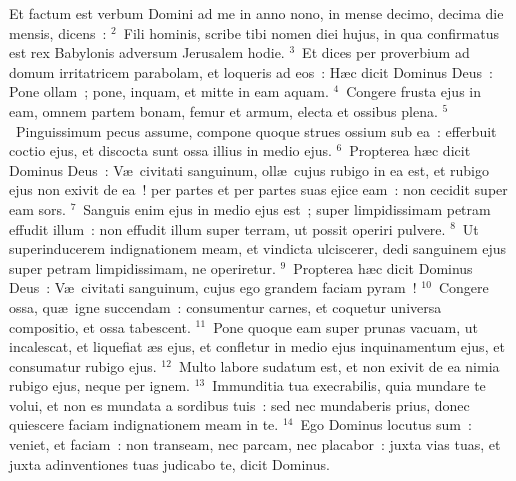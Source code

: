 \bchapter
\lettrine[lines=3,image=true,loversize=0.05,lraise=-0.03]{E}{}t factum est verbum Domini ad me in anno nono, in mense decimo, decima die mensis, dicens~:
${}^{2}$~Fili hominis, scribe tibi nomen diei hujus, in qua confirmatus est rex Babylonis adversum Jerusalem hodie.
${}^{3}$~Et dices per proverbium ad domum irritatricem parabolam, et loqueris ad eos~: H\ae c dicit Dominus Deus~: Pone ollam~; pone, inquam, et mitte in eam aquam.
${}^{4}$~Congere frusta ejus in eam, omnem partem bonam, femur et armum, electa et ossibus plena.
${}^{5}$~Pinguissimum pecus assume, compone quoque strues ossium sub ea~: efferbuit coctio ejus, et discocta sunt ossa illius in medio ejus.
${}^{6}$~Propterea h\ae c dicit Dominus Deus~: V\ae\ civitati sanguinum, oll\ae\ cujus rubigo in ea est, et rubigo ejus non exivit de ea~! per partes et per partes suas ejice eam~: non cecidit super eam sors.
${}^{7}$~Sanguis enim ejus in medio ejus est~; super limpidissimam petram effudit illum~: non effudit illum super terram, ut possit operiri pulvere.
${}^{8}$~Ut superinducerem indignationem meam, et vindicta ulciscerer, dedi sanguinem ejus super petram limpidissimam, ne operiretur.
${}^{9}$~Propterea h\ae c dicit Dominus Deus~: V\ae\ civitati sanguinum, cujus ego grandem faciam pyram~!
${}^{10}$~Congere ossa, qu\ae\ igne succendam~: consumentur carnes, et coquetur universa compositio, et ossa tabescent.
${}^{11}$~Pone quoque eam super prunas vacuam, ut incalescat, et liquefiat \ae s ejus, et confletur in medio ejus inquinamentum ejus, et consumatur rubigo ejus.
${}^{12}$~Multo labore sudatum est, et non exivit de ea nimia rubigo ejus, neque per ignem.
${}^{13}$~Immunditia tua execrabilis, quia mundare te volui, et non es mundata a sordibus tuis~: sed nec mundaberis prius, donec quiescere faciam indignationem meam in te.
${}^{14}$~Ego Dominus locutus sum~: veniet, et faciam~: non transeam, nec parcam, nec placabor~: juxta vias tuas, et juxta adinventiones tuas judicabo te, dicit Dominus.


